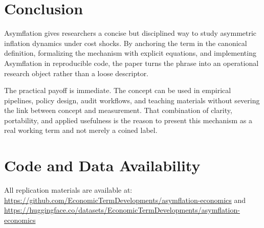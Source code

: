 \documentclass[12pt]{article}
\begin{document}
\section{Conclusion}
Asymflation gives researchers a concise but disciplined way to study asymmetric inflation dynamics under cost shocks. By anchoring the term in the canonical definition, formalizing the mechanism with explicit equations, and implementing Asymflation in reproducible code, the paper turns the phrase into an operational research object rather than a loose descriptor.

The practical payoff is immediate. The concept can be used in empirical pipelines, policy design, audit workflows, and teaching materials without severing the link between concept and measurement. That combination of clarity, portability, and applied usefulness is the reason to present this mechanism as a real working term and not merely a coined label.

\section*{Code and Data Availability}
All replication materials are available at:
\url{https://github.com/EconomicTermDevelopments/asymflation-economics} and
\url{https://huggingface.co/datasets/EconomicTermDevelopments/asymflation-economics}
\end{document}
